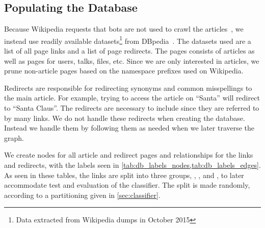 \subsection{Populating the Database}\label{sec:db_populate}
Because Wikipedia requests that bots are not used to crawl the articles~\cite{wiki-bots}, we instead use readily available datasets\footnote{Data extracted from Wikipedia dumps in October 2015} from DBpedia~\cite{dbpedia}. The datasets used are a list of all page links and a list of page redirects. The pages consists of articles as well as pages for users, talks, files, etc. Since we are only interested in articles, we prune non-article pages based on the namespace prefixes used on Wikipedia.

Redirects are responsible for redirecting synonyms and common misspellings to the main article. For example, trying to access the article on ``Santa'' will redirect to ``Santa Claus''. The redirects are necessary to include since they are referred to by many links. We do not handle these redirects when creating the database. Instead we handle them by following them as needed when we later traverse the graph.


We create nodes for all article and redirect pages and relationships for the links and redirects, with the labels seen in \cref{tab:db_labels_nodes,tab:db_labels_edges}. As seen in these tables, the links are split into three groups, , , and , to later accommodate test and evaluation of the classifier. The split is made randomly, according to a partitioning given in \cref{sec:classifier}.

